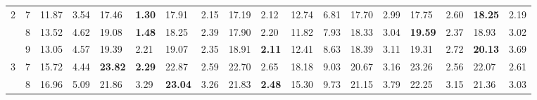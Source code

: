 \documentclass[conference]{IEEEtran}
\begin{document}
\begin{table}[]
\begin{tabular}{|cl|ll|ll|ll|ll|ll|ll|ll|ll|}
		\multicolumn{1}{|c|}{\multirow{3}{*}{2}}  & 7          & \multicolumn{1}{l|}{11.87}         & 3.54          & \multicolumn{1}{l|}{17.46}          & \textbf{1.30} & \multicolumn{1}{l|}{17.91}          & 2.15          & \multicolumn{1}{l|}{17.19}          & 2.12          & \multicolumn{1}{l|}{12.74}                & 6.81  & \multicolumn{1}{l|}{17.70} & 2.99 & \multicolumn{1}{l|}{17.75}          & 2.60          & \multicolumn{1}{l|}{\textbf{18.25}} & 2.19          \\ \cline{2-18} 
		\multicolumn{1}{|c|}{}                    & 8          & \multicolumn{1}{l|}{13.52}         & 4.62          & \multicolumn{1}{l|}{19.08}          & \textbf{1.48} & \multicolumn{1}{l|}{18.25}          & 2.39          & \multicolumn{1}{l|}{17.90}          & 2.20          & \multicolumn{1}{l|}{11.82}                & 7.93  & \multicolumn{1}{l|}{18.33} & 3.04 & \multicolumn{1}{l|}{\textbf{19.59}} & 2.37          & \multicolumn{1}{l|}{18.93}          & 3.02          \\ \cline{2-18} 
		\multicolumn{1}{|c|}{}                    & 9          & \multicolumn{1}{l|}{13.05}         & 4.57          & \multicolumn{1}{l|}{19.39}          & 2.21          & \multicolumn{1}{l|}{19.07}          & 2.35          & \multicolumn{1}{l|}{18.91}          & \textbf{2.11} & \multicolumn{1}{l|}{12.41}                & 8.63  & \multicolumn{1}{l|}{18.39} & 3.11 & \multicolumn{1}{l|}{19.31}          & 2.72          & \multicolumn{1}{l|}{\textbf{20.13}} & 3.69          \\ \hline
		\multicolumn{1}{|c|}{\multirow{3}{*}{3}}  & 7          & \multicolumn{1}{l|}{15.72}         & 4.44          & \multicolumn{1}{l|}{\textbf{23.82}} & \textbf{2.29} & \multicolumn{1}{l|}{22.87}          & 2.59          & \multicolumn{1}{l|}{22.70}          & 2.65          & \multicolumn{1}{l|}{18.18}                & 9.03  & \multicolumn{1}{l|}{20.67} & 3.16 & \multicolumn{1}{l|}{23.26}          & 2.56          & \multicolumn{1}{l|}{22.07}          & 2.61          \\ \cline{2-18} 
		\multicolumn{1}{|c|}{}                    & 8          & \multicolumn{1}{l|}{16.96}         & 5.09          & \multicolumn{1}{l|}{21.86}          & 3.29          & \multicolumn{1}{l|}{\textbf{23.04}} & 3.26          & \multicolumn{1}{l|}{21.83}          & \textbf{2.48} & \multicolumn{1}{l|}{15.30}                & 9.73  & \multicolumn{1}{l|}{21.15} & 3.79 & \multicolumn{1}{l|}{22.25}          & 3.15          & \multicolumn{1}{l|}{21.36}          & 3.03          \\ \cline{2-18} 

\end{tabular}
\end{table}
\end{document}
